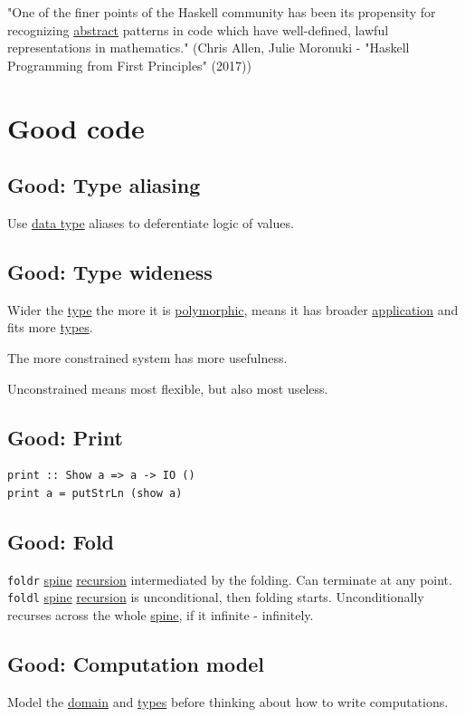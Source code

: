 \documentclass[a4paper,14pt,oneside]{book}
\begin{document}
"One of the finer points of the Haskell community has been its propensity for recognizing \hyperref[org20582f9]{abstract} patterns in code which have well-defined, lawful representations in mathematics." (Chris Allen, Julie Moronuki - "Haskell Programming from First Principles" (2017))

\part{Good code}
\label{sec:orge87c653}
\chapter{\label{org509b20c}Good: Type aliasing}
\label{sec:orgb9f7732}
Use \hyperref[orge045498]{data type} aliases to deferentiate logic of values.

\chapter{\label{orgc070dbb}Good: Type wideness}
\label{sec:org08df513}
Wider the \hyperref[orgcb0bd28]{type} the more it is \hyperref[org6c89719]{polymorphic}, means it has broader \hyperref[org422514c]{application} and fits more \hyperref[org06447a0]{types}.

The more constrained system has more usefulness.

Unconstrained means most flexible, but also most useless.

\chapter{\label{org56ace77}Good: Print}
\label{sec:orgaeb8ac2}
\begin{verbatim}
print :: Show a => a -> IO ()
print a = putStrLn (show a)
\end{verbatim}

\chapter{\label{orgbd09411}Good: Fold}
\label{sec:orgbbbc702}
\texttt{foldr} \hyperref[orgd85223d]{spine} \hyperref[org7a65c04]{recursion} intermediated by the folding. Can terminate at any point.
\texttt{foldl} \hyperref[orgd85223d]{spine} \hyperref[org7a65c04]{recursion} is unconditional, then folding starts. Unconditionally recurses across the whole \hyperref[orgd85223d]{spine}, if it infinite - infinitely.

\chapter{\label{orgf8284d9}Good: Computation model}
\label{sec:org0e9f2f6}
Model the \hyperref[org40f8685]{domain} and \hyperref[org06447a0]{types} before thinking about how to write computations.
\end{document}
